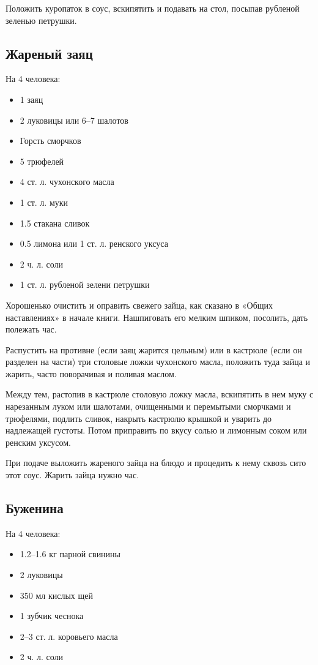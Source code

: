 Положить куропаток в соус, вскипятить и подавать на стол, посыпав рубленой зеленью петрушки.

\subsection{Жареный заяц}
На 4 человека:
\begin{itemize} 
	\item 1 заяц 
    \item 2 луковицы или 6–7 шалотов 
    \item Горсть сморчков 
    \item 5 трюфелей 
    \item 4 ст. л. чухонского масла 
    \item 1 ст. л. муки 
    \item 1.5 стакана сливок 
    \item 0.5 лимона или 1 ст. л. ренского уксуса 
    \item 2 ч. л. соли 
    \item 1 ст. л. рубленой зелени петрушки
\end{itemize}

Хорошенько очистить и оправить свежего зайца, как сказано в «Общих наставлениях» в начале книги. Нашпиговать его мелким шпиком, посолить, дать полежать час.

Распустить на противне (если заяц жарится цельным) или в кастрюле (если он разделен на части) три столовые ложки чухонского масла, положить туда зайца и жарить, часто поворачивая и поливая маслом.

Между тем, растопив в кастрюле столовую ложку масла, вскипятить в нем муку с нарезанным луком или шалотами, очищенными и перемытыми сморчками и трюфелями, подлить сливок, накрыть кастрюлю крышкой и уварить до надлежащей густоты. Потом приправить по вкусу солью и лимонным соком или ренским уксусом.

При подаче выложить жареного зайца на блюдо и процедить к нему сквозь сито этот соус. Жарить зайца нужно час.

\subsection{Буженина}
На 4 человека:
\begin{itemize} 
	\item 1.2–1.6 кг парной свинины 
    \item 2 луковицы 
    \item 350 мл кислых щей 
    \item 1 зубчик чеснока 
    \item 2–3 ст. л. коровьего масла 
    \item 2 ч. л. соли
\end{itemize}

